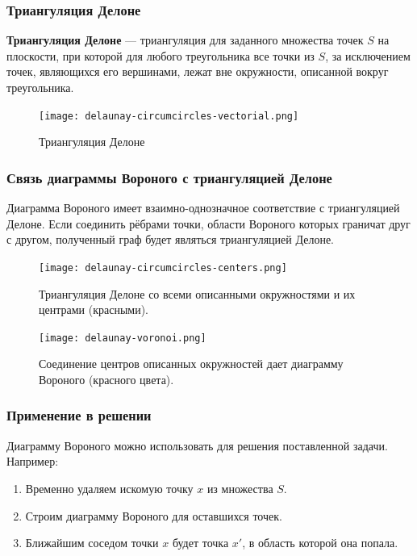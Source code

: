 \newpage

\subsubsection*{Триангуляция Делоне}

\textbf{Триангуляция Делоне} — триангуляция для заданного множества точек $S$ на плоскости, при которой для любого треугольника все точки из $S$, за исключением точек, являющихся его вершинами, лежат вне окружности, описанной вокруг треугольника.

\begin{figure}[H]
    \centering
    \texttt{[image: delaunay-circumcircles-vectorial.png]}
    \caption{Триангуляция Делоне}
\end{figure}

\newpage

\subsubsection*{Связь диаграммы Вороного с триангуляцией Делоне}

Диаграмма Вороного имеет взаимно-однозначное соответствие с триангуляцией Делоне. Если соединить рёбрами точки, области Вороного которых граничат друг с другом, полученный граф будет являться триангуляцией Делоне.

\begin{figure}[H]
\begin{center}
\begin{minipage}[h]{0.45\linewidth}
    \texttt{[image: delaunay-circumcircles-centers.png]}
    \caption{Триангуляция Делоне со всеми описанными окружностями и их центрами (красными).}
\end{minipage}
\hfill
\begin{minipage}[h]{0.45\linewidth}
    \texttt{[image: delaunay-voronoi.png]}
    \caption{Соединение центров описанных окружностей дает диаграмму Вороного (красного цвета).}
\end{minipage}
\end{center}
\end{figure}

\subsubsection*{Применение в решении}

Диаграмму Вороного можно использовать для решения поставленной задачи. Например:
\begin{enumerate}
    \item Временно удаляем искомую точку $x$ из множества $S$.
    \item Строим диаграмму Вороного для оставшихся точек.
    \item Ближайшим соседом точки $x$ будет точка $x'$, в область которой она попала.
\end{enumerate}

